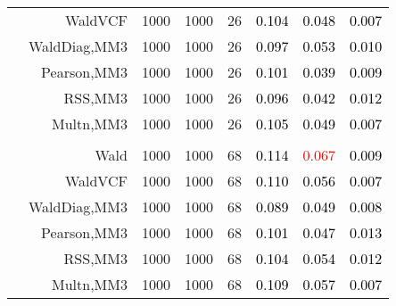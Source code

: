 \documentclass[
]{article}
\begin{document}
\begin{table}[H]
{\begin{tabular}[t]{lrrrrrrr}
\hspace{1em} & WaldVCF & 1000 & 1000 & 26 & \textcolor{black}{0.104} & \textcolor{black}{0.048} & \textcolor{black}{0.007}\\

\hspace{1em} & WaldDiag,MM3 & 1000 & 1000 & 26 & \textcolor{black}{0.097} & \textcolor{black}{0.053} & \textcolor{black}{0.010}\\

\hspace{1em} & Pearson,MM3 & 1000 & 1000 & 26 & \textcolor{black}{0.101} & \textcolor{black}{0.039} & \textcolor{black}{0.009}\\

\hspace{1em} & RSS,MM3 & 1000 & 1000 & 26 & \textcolor{black}{0.096} & \textcolor{black}{0.042} & \textcolor{black}{0.012}\\

\hspace{1em} & Multn,MM3 & 1000 & 1000 & 26 & \textcolor{black}{0.105} & \textcolor{black}{0.049} & \textcolor{black}{0.007}\\
\cmidrule{1-8}
\addlinespace[0.3em]
\multicolumn{8}{l}{\textbf{3F 15V}}\\
\hspace{1em} & Wald & 1000 & 1000 & 68 & \textcolor{black}{0.114} & \textcolor{red}{0.067} & \textcolor{black}{0.009}\\

\hspace{1em} & WaldVCF & 1000 & 1000 & 68 & \textcolor{black}{0.110} & \textcolor{black}{0.056} & \textcolor{black}{0.007}\\

\hspace{1em} & WaldDiag,MM3 & 1000 & 1000 & 68 & \textcolor{black}{0.089} & \textcolor{black}{0.049} & \textcolor{black}{0.008}\\

\hspace{1em} & Pearson,MM3 & 1000 & 1000 & 68 & \textcolor{black}{0.101} & \textcolor{black}{0.047} & \textcolor{black}{0.013}\\

\hspace{1em} & RSS,MM3 & 1000 & 1000 & 68 & \textcolor{black}{0.104} & \textcolor{black}{0.054} & \textcolor{black}{0.012}\\

\hspace{1em} & Multn,MM3 & 1000 & 1000 & 68 & \textcolor{black}{0.109} & \textcolor{black}{0.057} & \textcolor{black}{0.007}\\
\bottomrule
\end{tabular}}
\endgroup{}
\end{table}
\end{document}
